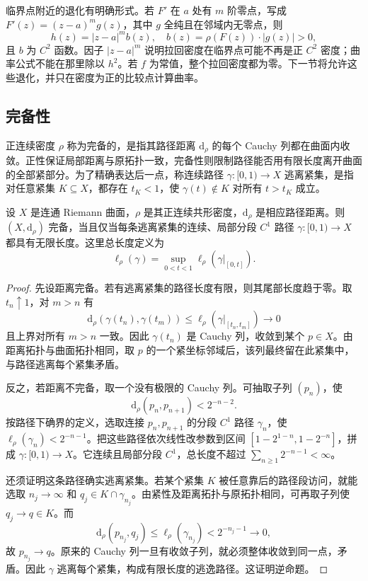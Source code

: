 临界点附近的退化有明确形式。若 \(F'\) 在 \(a\) 处有 \(m\) 阶零点，写成 \(F'(z)=(z-a)^m g(z)\)，其中 \(g\) 全纯且在邻域内无零点，则
\[
 h(z)=|z-a|^m b(z),
 \quad b(z)=\rho(F(z))\cdot|g(z)|>0,
\]
且 \(b\) 为 \(C^2\) 函数。因子 \(|z-a|^m\) 说明拉回密度在临界点可能不再是正 \(C^2\) 密度；曲率公式不能在那里除以 \(h^2\)。若 \(f\) 为常值，整个拉回密度都为零。下一节将允许这些退化，并只在密度为正的比较点计算曲率。

\subsection{完备性}
\label{b3:subsec:140104}

正连续密度 \(\rho\) 称为完备的，是指其路径距离 \(\mathrm d_\rho\) 的每个 Cauchy 列都在曲面内收敛。正性保证局部距离与原拓扑一致，完备性则限制路径能否用有限长度离开曲面的全部紧部分。为了精确表达后一点，称连续路径 \(\gamma:[0,1)\to X\) 逃离紧集，是指对任意紧集 \(K\subseteq X\)，都存在 \(t_K<1\)，使 \(\gamma(t)\notin K\) 对所有 \(t>t_K\) 成立。

\begin{proposition}[完备性的逃逸路径判据]\label{b3:prop:14-completeness-escape}
设 \(X\) 是连通 Riemann 曲面，\(\rho\) 是其正连续共形密度，\(\mathrm d_\rho\) 是相应路径距离。则 \((X,\mathrm d_\rho)\) 完备，当且仅当每条逃离紧集的连续、局部分段 \(C^1\) 路径 \(\gamma:[0,1)\to X\) 都具有无限长度。这里总长度定义为
\[
 \ell_\rho(\gamma)=\sup_{0<t<1}\ell_\rho(\gamma|_{[0,t]}).
\]
\end{proposition}
\begin{proof}
先设距离完备。若有逃离紧集的路径长度有限，则其尾部长度趋于零。取 \(t_n\uparrow1\)，对 \(m>n\) 有
\[
 \mathrm d_\rho(\gamma(t_n),\gamma(t_m))
 \le\ell_\rho(\gamma|_{[t_n,t_m]})\longrightarrow0
\]
且上界对所有 \(m>n\) 一致。因此 \(\gamma(t_n)\) 是 Cauchy 列，收敛到某个 \(p\in X\)。由距离拓扑与曲面拓扑相同，取 \(p\) 的一个紧坐标邻域后，该列最终留在此紧集中，与路径逃离每个紧集矛盾。

反之，若距离不完备，取一个没有极限的 Cauchy 列。可抽取子列 \((p_n)\)，使
\[
 \mathrm d_\rho(p_n,p_{n+1})<2^{-n-2}.
\]
按路径下确界的定义，选取连接 \(p_n,p_{n+1}\) 的分段 \(C^1\) 路径 \(\gamma_n\)，使 \(\ell_\rho(\gamma_n)<2^{-n-1}\)。把这些路径依次线性改参数到区间 \([1-2^{1-n},1-2^{-n}]\)，拼成 \(\gamma:[0,1)\to X\)。它连续且局部分段 \(C^1\)，总长度不超过 \(\sum_{n\ge1}2^{-n-1}<\infty\)。

还须证明这条路径确实逃离紧集。若某个紧集 \(K\) 被任意靠后的路径段访问，就能选取 \(n_j\to\infty\) 和 \(q_j\in K\cap\gamma_{n_j}\)。由紧性及距离拓扑与原拓扑相同，可再取子列使 \(q_j\to q\in K\)。而
\[
 \mathrm d_\rho(p_{n_j},q_j)
 \le\ell_\rho(\gamma_{n_j})<2^{-n_j-1}\longrightarrow0,
\]
故 \(p_{n_j}\to q\)。原来的 Cauchy 列一旦有收敛子列，就必须整体收敛到同一点，矛盾。因此 \(\gamma\) 逃离每个紧集，构成有限长度的逃逸路径。这证明逆命题。
\end{proof}

